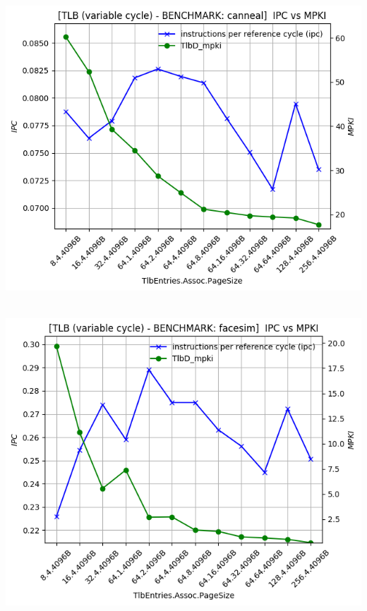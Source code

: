 \begin{minipage}{\textwidth}
    \begin{center}
        \\
        \vspace{3mm}
        \includegraphics[scale=0.65]{graphs/TLB/var/canneal.png}
        \vspace{6mm}
    \end{center}
\end{minipage}

\begin{minipage}{\textwidth}
    \begin{center}
        \\
        \vspace{3mm}
        \includegraphics[scale=0.65]{graphs/TLB/var/facesim.png}
        \vspace{6mm}
    \end{center}
\end{minipage}

